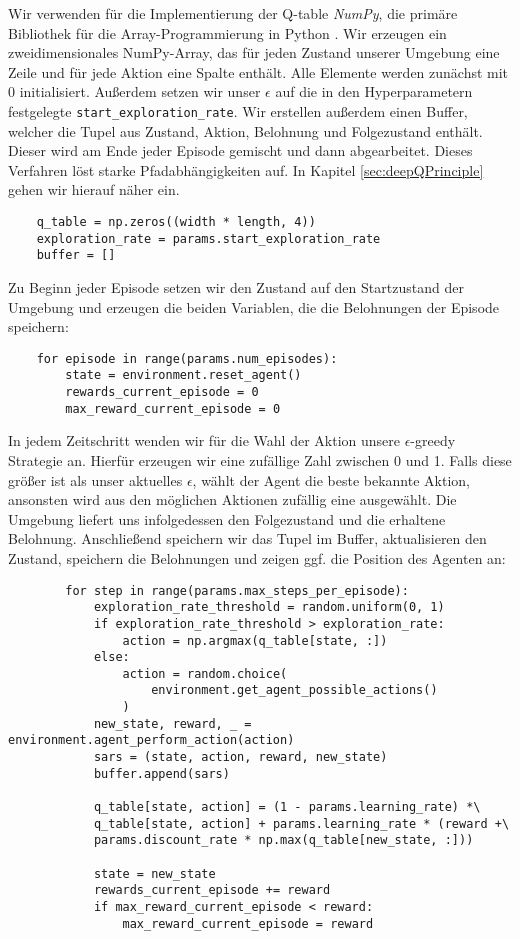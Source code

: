 Wir verwenden für die Implementierung der Q-table \textit{NumPy}, die primäre Bibliothek für die Array-Programmierung in Python \cite{harris2020array}. Wir erzeugen ein zweidimensionales NumPy-Array, das für jeden Zustand unserer Umgebung eine Zeile und für jede Aktion eine Spalte enthält. Alle Elemente werden zunächst mit 0 initialisiert. Außerdem setzen wir unser $ \epsilon $ auf die in den Hyperparametern festgelegte \texttt{start_exploration_rate}. Wir erstellen außerdem einen Buffer, welcher die Tupel aus Zustand, Aktion, Belohnung und Folgezustand enthält. Dieser wird am Ende jeder Episode gemischt und dann abgearbeitet. Dieses Verfahren löst starke Pfadabhängigkeiten auf. In Kapitel \ref{sec:deepQPrinciple} gehen wir hierauf näher ein.
\begin{verbatim}
    q_table = np.zeros((width * length, 4))
    exploration_rate = params.start_exploration_rate
    buffer = []
\end{verbatim}

Zu Beginn jeder Episode setzen wir den Zustand auf den Startzustand der Umgebung und erzeugen die beiden Variablen, die die Belohnungen der Episode speichern:
\begin{verbatim}
    for episode in range(params.num_episodes):
        state = environment.reset_agent()
        rewards_current_episode = 0
        max_reward_current_episode = 0
\end{verbatim}

In jedem Zeitschritt wenden wir für die Wahl der Aktion unsere $ \epsilon $-greedy Strategie an. Hierfür erzeugen wir eine zufällige Zahl zwischen 0 und 1. Falls diese größer ist als unser aktuelles $ \epsilon $, wählt der Agent die beste bekannte Aktion, ansonsten wird aus den möglichen Aktionen zufällig eine ausgewählt. Die Umgebung liefert uns infolgedessen den Folgezustand und die erhaltene Belohnung. Anschließend speichern wir das Tupel im Buffer, aktualisieren den Zustand, speichern die Belohnungen und zeigen ggf. die Position des Agenten an:
\begin{verbatim}
        for step in range(params.max_steps_per_episode):
            exploration_rate_threshold = random.uniform(0, 1)
            if exploration_rate_threshold > exploration_rate:
                action = np.argmax(q_table[state, :])
            else:
                action = random.choice(
                    environment.get_agent_possible_actions()
                )
            new_state, reward, _ = environment.agent_perform_action(action)
            sars = (state, action, reward, new_state)
            buffer.append(sars)

            q_table[state, action] = (1 - params.learning_rate) *\
            q_table[state, action] + params.learning_rate * (reward +\
            params.discount_rate * np.max(q_table[new_state, :]))

            state = new_state
            rewards_current_episode += reward
            if max_reward_current_episode < reward:
                max_reward_current_episode = reward
\end{verbatim}

